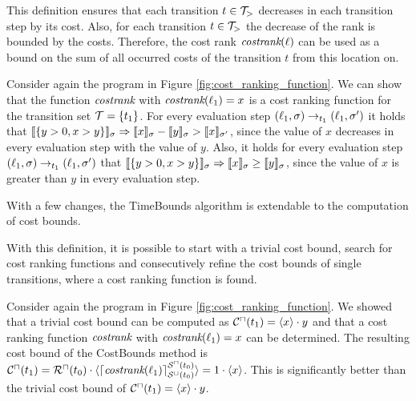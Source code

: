 This definition ensures that each transition $t \in \mathcal{T}_>$ decreases in each transition step by its cost.
Also, for each transition $t \in \mathcal{T}_>$ the decrease of the rank  is bounded by the costs.
Therefore, the cost rank $\emph{costrank}(\ell)$ can be used as a bound on the sum of all occurred costs of the transition $t$ from this location on.

\begin{example}
  Consider again the program in Figure \ref{fig:cost_ranking_function}.
  We can show that the function $\emph{costrank}$ with $\emph{costrank}(\ell_1) = x$ is a cost ranking function for the transition set $\mathcal{T} = \lbrace t_1 \rbrace$.
  For every evaluation step $(\ell_1,\sigma) \rightarrow_{t_1} (\ell_1,\sigma')$ it holds that $\llbracket \lbrace y > 0, x > y \rbrace \rrbracket_{\sigma} \Rightarrow \llbracket x \rrbracket_{\sigma} - \llbracket y \rrbracket_{\sigma} > \llbracket x \rrbracket_{\sigma'}$, since the value of $x$ decreases in every evaluation step with the value of $y$.
  Also, it holds for every evaluation step $(\ell_1,\sigma) \rightarrow_{t_1} (\ell_1,\sigma')$ that $\llbracket \lbrace y > 0, x > y \rbrace \rrbracket_{\sigma} \Rightarrow \llbracket x \rrbracket_{\sigma} \geq \llbracket y \rrbracket_{\sigma}$, since the value of $x$ is greater than $y$ in every evaluation step.
\end{example}

With a few changes, the TimeBounds algorithm is extendable to the computation of cost bounds.



With this definition, it is possible to start with a trivial cost bound, search for cost ranking functions and consecutively refine the cost bounds of single transitions, where a cost ranking function is found.

\begin{example}[CostBounds]
  Consider again the program in Figure \ref{fig:cost_ranking_function}.
  We showed that a trivial cost bound can be computed as ${\mathcal{C}^\sqcap}(t_1) = \langle x\rangle \cdot y$ and that a cost ranking function $\emph{costrank}$ with $\emph{costrank}(\ell_1) = x$ can be determined.
  The resulting cost bound of the CostBounds method is ${\mathcal{C}^\sqcap}(t_1) = {\mathcal{R}^\sqcap}(t_0) \cdot \langle\lceil \emph{costrank}(\ell_1) \rceil^{{\mathcal{S}^\sqcap}(t_0)}_{{\mathcal{S}^\sqcup}(t_0)}\rangle = 1 \cdot \langle x\rangle$.
  This is significantly better than the trivial cost bound of ${\mathcal{C}^\sqcap}(t_1) = \langle x\rangle \cdot y$.
\end{example}

